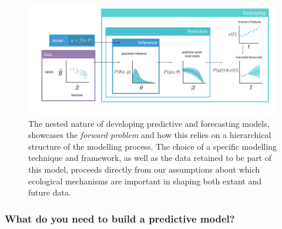 \begin{refsection}
\begin{figure}[h]
    \centering
    \includegraphics[width=\textwidth]{figures/forecasting_v4.png}
    \caption{The nested nature of developing predictive and forecasting
models, showcases the \emph{forward problem} and how this relies on a
hierarchical structure of the modelling process. The choice of a
specific modelling technique and framework, as well as the data retained
to be part of this model, proceeds directly from our assumptions about
which ecological mechanisms are important in shaping both extant and
future data.}
    \label{fig:models}
\end{figure}

\clearpage

\subsubsection{What do you need to build a predictive
model?}\label{what-do-you-need-to-build-a-predictive-model}


\end{refsection}
